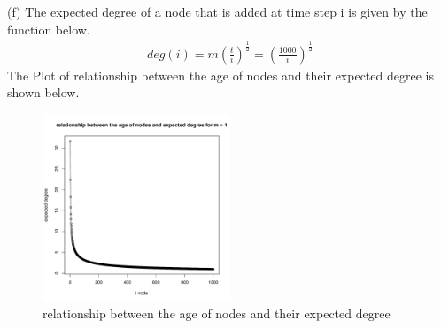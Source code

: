\documentclass[draftcls,12pt,onecolumn]{IEEEtran}
\begin{document}
(f) The expected degree of a node that is added at time step i is given by the function below.
\begin{align*}
deg(i)=m(\frac{t}{i})^{\frac{1}{2}}=(\frac{1000}{i})^{\frac{1}{2}}
\end{align*}
The Plot of relationship between the age of nodes and their expected degree is shown below.
\begin{figure}[H]
\centering
\includegraphics[width=0.5\textwidth]{1_2_f.pdf}
\caption{relationship between the age of nodes and their expected degree}
\end{figure}
\end{document}
